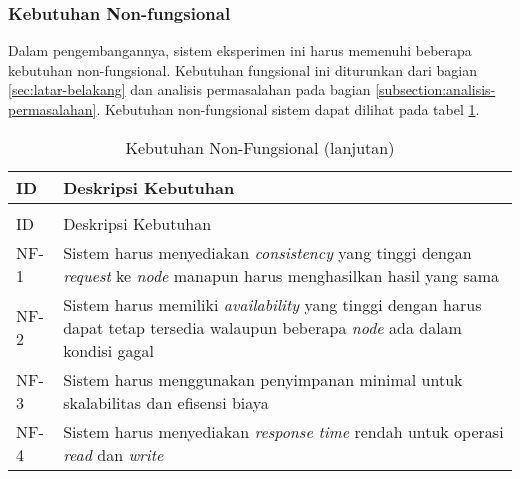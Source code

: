 \subsubsection{Kebutuhan Non-fungsional}
\label{subsubsection:non-functional-requirements}

Dalam pengembangannya, sistem eksperimen ini harus memenuhi beberapa kebutuhan non-fungsional. Kebutuhan fungsional ini diturunkan dari bagian \ref{sec:latar-belakang} dan analisis permasalahan pada bagian \ref{subsection:analisis-permasalahan}. Kebutuhan non-fungsional sistem dapat dilihat pada tabel \ref{tab:non-functional-requirements}.

\begin{longtable}{|l|p{13cm}|}
\caption{Kebutuhan Non-Fungsional}
\label{tab:non-functional-requirements} \\
\hline
\rowcolor{black!10} ID & Deskripsi Kebutuhan \\ \hline
\endfirsthead

\caption[]{Kebutuhan Non-Fungsional (lanjutan)} \\
\hline
\rowcolor{black!10} ID & Deskripsi Kebutuhan \\ \hline
\endhead

NF-1 & Sistem harus menyediakan \textit{consistency} yang tinggi dengan \textit{request} ke \textit{node} manapun harus menghasilkan hasil yang sama \\ \hline
NF-2 & Sistem harus memiliki \textit{availability} yang tinggi dengan harus dapat tetap tersedia walaupun beberapa \textit{node} ada dalam kondisi gagal \\ \hline
NF-3 & Sistem harus menggunakan penyimpanan minimal untuk skalabilitas dan efisensi biaya \\ \hline
NF-4 & Sistem harus menyediakan \textit{response time} rendah untuk operasi \textit{read} dan \textit{write} \\ \hline
\end{longtable}